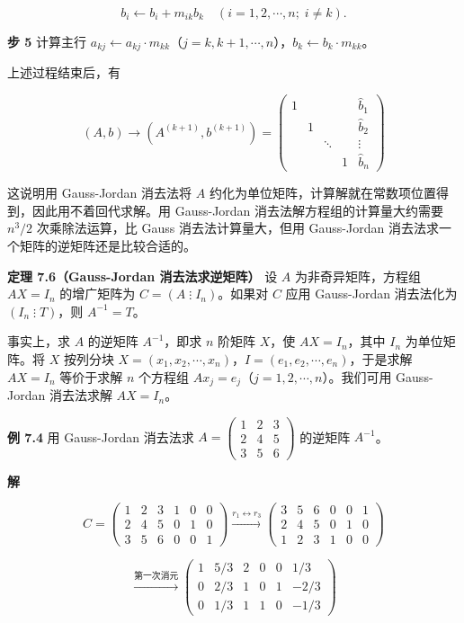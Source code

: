 \documentclass[
  10pt,
  fontset=fandol]{ctexart}
\begin{document}
\[b_i\leftarrow b_i+m_{ik}b_k\quad(i=1,2,\cdots,n;\;i\ne k).\]

\textbf{步 5} 计算主行 \(a_{kj}\leftarrow a_{kj}\cdot m_{kk}\)（\(j=k,k+1,\cdots,n\)），\(b_k\leftarrow b_k\cdot m_{kk}\)。

上述过程结束后，有

\[
(A,b)\to(A^{(k+1)},b^{(k+1)})=
\left(\begin{array}{cccc|c}
1&&&&\widehat{b}_1\\
&1&&&\widehat{b}_2\\
&&\ddots&&\vdots\\
&&&1&\widehat{b}_n
\end{array}\right)
\]

这说明用 Gauss-Jordan 消去法将 \(A\) 约化为单位矩阵，计算解就在常数项位置得到，因此用不着回代求解。用 Gauss-Jordan 消去法解方程组的计算量大约需要 \(n^3/2\) 次乘除法运算，比 Gauss 消去法计算量大，但用 Gauss-Jordan 消去法求一个矩阵的逆矩阵还是比较合适的。

\textbf{定理 7.6（Gauss-Jordan 消去法求逆矩阵）} 设 \(A\) 为非奇异矩阵，方程组 \(AX=I_n\) 的增广矩阵为 \(C=(A\mathbin{\vdots}I_n)\)。如果对 \(C\) 应用 Gauss-Jordan 消去法化为 \((I_n\mathbin{\vdots}T)\)，则 \(A^{-1}=T\)。

事实上，求 \(A\) 的逆矩阵 \(A^{-1}\)，即求 \(n\) 阶矩阵 \(X\)，使 \(AX=I_n\)，其中 \(I_n\) 为单位矩阵。将 \(X\) 按列分块 \(X=(x_1,x_2,\cdots,x_n)\)，\(I=(e_1,e_2,\cdots,e_n)\)，于是求解 \(AX=I_n\) 等价于求解 \(n\) 个方程组 \(Ax_j=e_j\)（\(j=1,2,\cdots,n\)）。我们可用 Gauss-Jordan 消去法求解 \(AX=I_n\)。

\textbf{例 7.4} 用 Gauss-Jordan 消去法求 \(A=\begin{pmatrix}1&2&3\\2&4&5\\3&5&6\end{pmatrix}\) 的逆矩阵 \(A^{-1}\)。

\textbf{解}

\[
C=\left(\begin{array}{rrr|rrr}
1&2&3&1&0&0\\
2&4&5&0&1&0\\
3&5&6&0&0&1
\end{array}\right)
\xrightarrow{r_1\leftrightarrow r_3}
\left(\begin{array}{rrr|rrr}
\boxed{3}&5&6&0&0&1\\
2&4&5&0&1&0\\
1&2&3&1&0&0
\end{array}\right)
\]

\[
\xrightarrow{\text{第一次消元}}
\left(\begin{array}{rrr|rrr}
1&5/3&2&0&0&1/3\\
0&2/3&1&0&1&-2/3\\
0&1/3&1&1&0&-1/3
\end{array}\right)
\]
\end{document}
